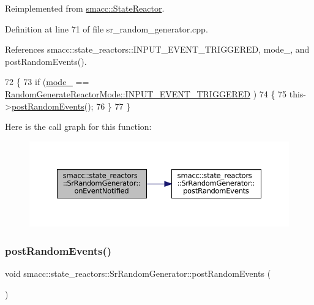 Reimplemented from \hyperlink{classsmacc_1_1StateReactor_a17646b3c68a6d80d1e4da8c14238ce36}{smacc\+::\+State\+Reactor}.



Definition at line 71 of file sr\+\_\+random\+\_\+generator.\+cpp.



References smacc\+::state\+\_\+reactors\+::\+I\+N\+P\+U\+T\+\_\+\+E\+V\+E\+N\+T\+\_\+\+T\+R\+I\+G\+G\+E\+R\+ED, mode\+\_\+, and post\+Random\+Events().


\begin{DoxyCode}
72 \{
73     \textcolor{keywordflow}{if} (\hyperlink{classsmacc_1_1state__reactors_1_1SrRandomGenerator_a10984da2fb51badf4fe6f25861120735}{mode\_} == \hyperlink{namespacesmacc_1_1state__reactors_a038f8e362ad6d35494c940ee4c97a52eab75323a08fc093fa69e7a6aceb681611}{RandomGenerateReactorMode::INPUT\_EVENT\_TRIGGERED}
      )
74     \{
75         this->\hyperlink{classsmacc_1_1state__reactors_1_1SrRandomGenerator_a50638c93ca9444fbeecea6e72bc6ac35}{postRandomEvents}();
76     \}
77 \}
\end{DoxyCode}
Here is the call graph for this function\+:
\nopagebreak
\begin{figure}[H]
\begin{center}
\leavevmode
\includegraphics[width=350pt]{classsmacc_1_1state__reactors_1_1SrRandomGenerator_a8635347245b76d17355fe374e854144f_cgraph}
\end{center}
\end{figure}
\mbox{\label{classsmacc_1_1state__reactors_1_1SrRandomGenerator_a50638c93ca9444fbeecea6e72bc6ac35}} 
\subsubsection{\texorpdfstring{post\+Random\+Events()}{postRandomEvents()}}
{\footnotesize\ttfamily void smacc\+::state\+\_\+reactors\+::\+Sr\+Random\+Generator\+::post\+Random\+Events (\begin{DoxyParamCaption}{ }\end{DoxyParamCaption})}



